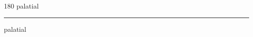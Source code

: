 
\begin{frame}
\begin{center}
\begin{turn}{180}
{\fontsize{2.5cm}{1em}\selectfont palatial}
\end{turn}
\vspace{1em}\par  
\hrule
\vspace{1em}\par  
{\fontsize{2.5cm}{1em}\selectfont palatial}
\end{center}
\end{frame}
